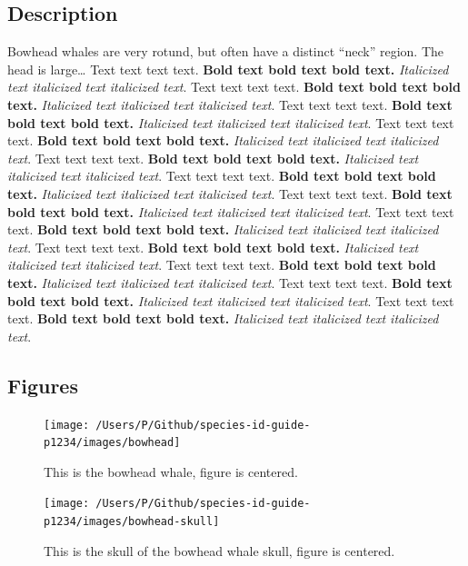 \documentclass[
]{article}
\begin{document}
\hypertarget{description-1}{%
\subsection{Description}\label{description-1}}

Bowhead whales are very rotund, but often have a distinct ``neck''
region. The head is large\ldots{} Text text text text. \textbf{Bold text
bold text bold text.} \emph{Italicized text italicized text italicized
text}. Text text text text. \textbf{Bold text bold text bold text.}
\emph{Italicized text italicized text italicized text}. Text text text
text. \textbf{Bold text bold text bold text.} \emph{Italicized text
italicized text italicized text}. Text text text text. \textbf{Bold text
bold text bold text.} \emph{Italicized text italicized text italicized
text}. Text text text text. \textbf{Bold text bold text bold text.}
\emph{Italicized text italicized text italicized text}. Text text text
text. \textbf{Bold text bold text bold text.} \emph{Italicized text
italicized text italicized text}. Text text text text. \textbf{Bold text
bold text bold text.} \emph{Italicized text italicized text italicized
text}. Text text text text. \textbf{Bold text bold text bold text.}
\emph{Italicized text italicized text italicized text}. Text text text
text. \textbf{Bold text bold text bold text.} \emph{Italicized text
italicized text italicized text}. Text text text text. \textbf{Bold text
bold text bold text.} \emph{Italicized text italicized text italicized
text}. Text text text text. \textbf{Bold text bold text bold text.}
\emph{Italicized text italicized text italicized text}. Text text text
text. \textbf{Bold text bold text bold text.} \emph{Italicized text
italicized text italicized text}.

\newpage

\hypertarget{figures-1}{%
\subsection{Figures}\label{figures-1}}

\begin{figure}
\texttt{[image: /Users/P/Github/species-id-guide-p1234/images/bowhead]} \caption{This is the bowhead whale, figure is centered.}\label{fig:bowhead-whale}
\end{figure}

\begin{figure}
\texttt{[image: /Users/P/Github/species-id-guide-p1234/images/bowhead-skull]} \caption{This is the skull of the bowhead whale skull, figure is centered.}\label{fig:bowhead-whale-skull}
\end{figure}
\end{document}
